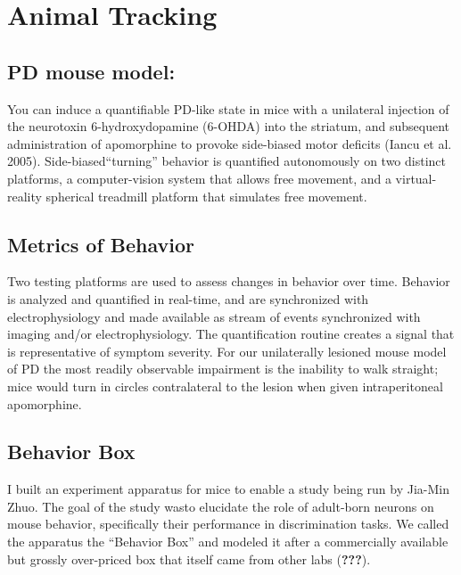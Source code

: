 \documentclass[
  12pt,
]{report}
\numberwithin{figure}{section}
\numberwithin{table}{section}
\numberwithin{equations}{section}
\begin{document}
\hypertarget{animal-tracking}{%
\section{Animal Tracking}\label{animal-tracking}}

\hypertarget{pd-mouse-model}{%
\subsection{PD mouse model:}\label{pd-mouse-model}}

You can induce a quantifiable PD-like state in mice with a unilateral
injection of the neurotoxin 6-hydroxydopamine (6-OHDA) into the
striatum, and subsequent administration of apomorphine to provoke
side-biased motor deficits (Iancu et al. 2005). Side-biased``turning''
behavior is quantified autonomously on two distinct platforms, a
computer-vision system that allows free movement, and a virtual-reality
spherical treadmill platform that simulates free movement.

\hypertarget{metrics-of-behavior}{%
\subsection{Metrics of Behavior}\label{metrics-of-behavior}}

Two testing platforms are used to assess changes in behavior over time.
Behavior is analyzed and quantified in real-time, and are synchronized
with electrophysiology and made available as stream of events
synchronized with imaging and/or electrophysiology. The quantification
routine creates a signal that is representative of symptom severity. For
our unilaterally lesioned mouse model of PD the most readily observable
impairment is the inability to walk straight; mice would turn in circles
contralateral to the lesion when given intraperitoneal apomorphine.

\hypertarget{behavior-box}{%
\subsection{Behavior Box}\label{behavior-box}}

I built an experiment apparatus for mice to enable a study being run by
Jia-Min Zhuo. The goal of the study wasto elucidate the role of
adult-born neurons on mouse behavior, specifically their performance in
discrimination tasks. We called the apparatus the ``Behavior Box'' and
modeled it after a commercially available but grossly over-priced box
that itself came from other labs ({\textbf{???}}).
\end{document}
